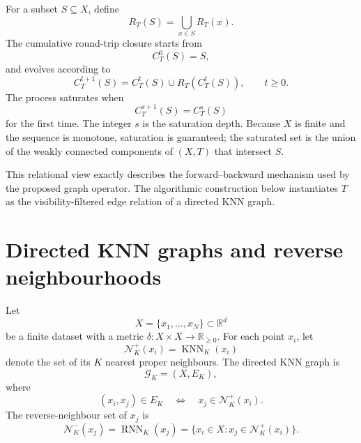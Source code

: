 \documentclass[pdflatex,sn-mathphys-num]{sn-jnl}
\newcommand{\R}{\mathbb{R}}
\newcommand{\calG}{\mathcal{G}}
\newcommand{\calN}{\mathcal{N}}
\newcommand{\KNN}{\operatorname{KNN}}
\newcommand{\RNN}{\operatorname{RNN}}
\begin{document}
For a subset $S\subseteq X$, define
\begin{equation}
R_T(S)=\bigcup_{x\in S}R_T(x).
\end{equation}
The cumulative round-trip closure starts from
\begin{equation}
C_T^0(S)=S,
\end{equation}
and evolves according to
\begin{equation}
C_T^{t+1}(S)=C_T^t(S)\cup R_T(C_T^t(S)),\qquad t\geq 0.
\label{eq:relational_iteration}
\end{equation}
The process saturates when
\begin{equation}
C_T^{s+1}(S)=C_T^s(S)
\end{equation}
for the first time.  The integer $s$ is the saturation depth.  Because $X$ is
finite and the sequence is monotone, saturation is guaranteed; the saturated
set is the union of the weakly connected components of $(X,T)$ that intersect
$S$.

This relational view exactly describes the forward--backward mechanism used by
the proposed graph operator.  The algorithmic construction below instantiates
$T$ as the visibility-filtered edge relation of a directed KNN graph.

\section{Directed KNN graphs and reverse neighbourhoods}\label{sec:knn_graph}

Let
\begin{equation}
X=\{x_1,\ldots,x_N\}\subset\R^d
\end{equation}
be a finite dataset with a metric $\delta:X\times X\to\R_{\geq 0}$. For each point $x_i$, let
\begin{equation}
\calN_K^+(x_i)=\KNN_K(x_i)
\end{equation}
denote the set of its $K$ nearest proper neighbours. The directed KNN graph is
\begin{equation}
\calG_K=(X,E_K),
\end{equation}
where
\begin{equation}
(x_i,x_j)\in E_K \quad\Longleftrightarrow\quad x_j\in\calN_K^+(x_i).
\end{equation}
The reverse-neighbour set of $x_j$ is
\begin{equation}
\calN_K^-(x_j)=\RNN_K(x_j)=\{x_i\in X:x_j\in\calN_K^+(x_i)\}.
\label{eq:rnn}
\end{equation}
\end{document}
